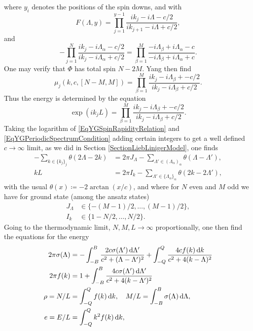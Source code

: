where $ y_i $ denotes the positions of the spin downs, and with \begin{equation}
F(\Lambda,y)=\prod_{j=1}^{y-1}\frac{ik_j-i\Lambda-c/2}{ik_{j+1}-i\Lambda+c/2},
\end{equation}
and \begin{equation}\label{EqYGSpinRapidityRelation}
-\prod_{j=1}^{N}\frac{ik_j-i\Lambda_\alpha-c/2}{ik_{j}-i\Lambda_\alpha+c/2}=\prod_{\beta=1}^{M}\frac{-i\Lambda_\beta+i\Lambda_\alpha-c}{-i\Lambda_\beta+i\Lambda_\alpha+c}.
\end{equation}
One may verify that $ \Phi $ has total spin $ N-2M $.
Yang then find \begin{equation}
\mu_j(k,c,[N-M,M])=\prod_{\beta=1}^{M}\frac{ik_j-i\Lambda_\beta+-c/2}{ik_j-i\Lambda_\beta+c/2}.
\end{equation}
Thus the energy is determined by the equation\begin{equation}\label{EqYGPeriodicSpectrumCondition}
\exp(ik_jL)=\prod_{\beta=1}^{M}\frac{ik_j-i\Lambda_\beta+-c/2}{ik_j-i\Lambda_\beta+c/2}.
\end{equation}
Taking the logarithm of \eqref{EqYGSpinRapidityRelation} and \eqref{EqYGPeriodicSpectrumCondition} adding certain integers to get a well defined $ c\to\infty $ limit, as we did in Section \ref{SectionLiebLinigerModel}, one finds \begin{equation}\label{EqYGintegers}
\begin{aligned}
-\sum_{k\in\{k_j\}_j}\theta(2\Lambda-2k)&=2\pi J_\Lambda-\sum_{\Lambda'\in(\Lambda_\alpha)_\alpha}\theta(\Lambda-\Lambda'),\\
kL&=2\pi I_k-\sum_{\Lambda'\in\{\Lambda_\alpha\}_\alpha}\theta(2k-2\Lambda'),
\end{aligned}
\end{equation}
with the usual $ \theta(x)\coloneqq-2\arctan(x/c) $, and where for $ N $ even and $ M $ odd we have for ground state (among the ansatz states)\begin{equation}
\begin{aligned}
J_\Lambda&\in\{-(M-1)/2,\ldots,(M-1)/2\},\\
I_k&\in \{1-N/2,\ldots,N/2\}.
\end{aligned}
\end{equation}
Going to the thermodynamic limit, \ie $ N,M,L\to\infty $ proportionally, one then find the equations for the energy \begin{align}
2\pi\sigma(\Lambda)&=-\int_{-B}^{B}\frac{2c\sigma(\Lambda')\mathop{}\!\mathrm{d} \Lambda'}{c^2+(\Lambda-\Lambda')^2}+\int_{-Q}^{Q}\frac{4c f(k)\mathop{}\!\mathrm{d} k}{c^2+4(k-\Lambda)^2}\label{EqYG1}\\
2\pi f(k) &= 1+\int_{-B}^{B}\frac{4c\sigma(\Lambda')\mathop{}\!\mathrm{d} \Lambda'}{c^2+4(k-\Lambda')^2}\label{EqYG2}\\
\rho=N/L&=\int_{-Q}^{Q} f(k) \mathop{}\!\mathrm{d} k,\quad M/L=\int_{-B}^{B}\sigma(\Lambda)\mathop{}\!\mathrm{d}\Lambda,\label{EqYG3}\\
e=E/L&=\int_{-Q}^{Q}k^2 f(k)\mathop{}\!\mathrm{d} k \label{EqYG4},
\end{align}
